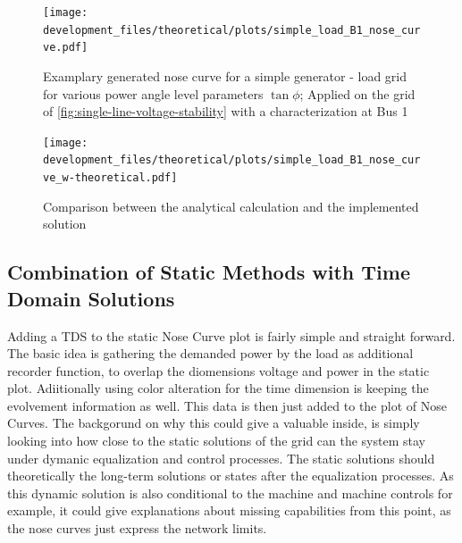 \begin{figure}[htbp!]
        \centering
        \texttt{[image: development\_files/theoretical/plots/simple\_load\_B1\_nose\_curve.pdf]}
        \caption[Examplary generated nose curve for a simple generator - load grid]{Examplary generated nose curve for a simple generator - load grid for various power angle level parameters $\tan \phi$; Applied on the grid of \autoref{fig:single-line-voltage-stability} with a characterization at Bus 1}
        \label{fig:nose-curve-simple-grid}
\end{figure}

\begin{figure}[htbp!]
        \centering
        \texttt{[image: development\_files/theoretical/plots/simple\_load\_B1\_nose\_curve\_w-theoretical.pdf]}
        \caption[Comparison between the analytical calculation and the implemented solution]{Comparison between the analytical calculation and the implemented solution}
        \label{fig:nose-curve-simple-comp}
\end{figure}


\subsection{Combination of Static Methods with Time Domain Solutions}
\label{sec:comb-time-dimension}

Adding a \acs{TDS} to the static Nose Curve plot is fairly simple and straight forward.
The basic idea is gathering the demanded power by the load as additional recorder function, to overlap the diomensions voltage and power in the static plot.
Adiitionally using color alteration for the time dimension is keeping the evolvement information as well.
This data is then just added to the plot of Nose Curves.
The backgorund on why this could give a valuable inside, is simply looking into how close to the static solutions of the grid can the system stay under dymanic equalization and control processes.
The static solutions should theoretically the long-term solutions or states after the equalization processes.
As this dynamic solution is also conditional to the machine and machine controls for example, it could give explanations about missing capabilities from this point, as the nose curves just express the network limits.

